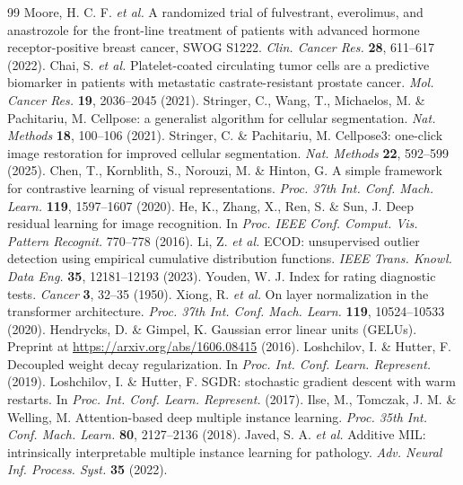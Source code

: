 \documentclass[11pt]{article}
\begin{document}
\begin{thebibliography}{99}
 Moore, H. C. F. \textit{et al.} A randomized trial of fulvestrant, everolimus, and anastrozole for the front-line treatment of patients with advanced hormone receptor-positive breast cancer, SWOG S1222. \textit{Clin. Cancer Res.} \textbf{28}, 611--617 (2022).
 Chai, S. \textit{et al.} Platelet-coated circulating tumor cells are a predictive biomarker in patients with metastatic castrate-resistant prostate cancer. \textit{Mol. Cancer Res.} \textbf{19}, 2036--2045 (2021).
 Stringer, C., Wang, T., Michaelos, M. \& Pachitariu, M. Cellpose: a generalist algorithm for cellular segmentation. \textit{Nat. Methods} \textbf{18}, 100--106 (2021).
 Stringer, C. \& Pachitariu, M. Cellpose3: one-click image restoration for improved cellular segmentation. \textit{Nat. Methods} \textbf{22}, 592--599 (2025).
 Chen, T., Kornblith, S., Norouzi, M. \& Hinton, G. A simple framework for contrastive learning of visual representations. \textit{Proc. 37th Int. Conf. Mach. Learn.} \textbf{119}, 1597--1607 (2020).
 He, K., Zhang, X., Ren, S. \& Sun, J. Deep residual learning for image recognition. In \textit{Proc. IEEE Conf. Comput. Vis. Pattern Recognit.} 770--778 (2016).
 Li, Z. \textit{et al.} ECOD: unsupervised outlier detection using empirical cumulative distribution functions. \textit{IEEE Trans. Knowl. Data Eng.} \textbf{35}, 12181--12193 (2023).
 Youden, W. J. Index for rating diagnostic tests. \textit{Cancer} \textbf{3}, 32--35 (1950).
 Xiong, R. \textit{et al.} On layer normalization in the transformer architecture. \textit{Proc. 37th Int. Conf. Mach. Learn.} \textbf{119}, 10524--10533 (2020).
 Hendrycks, D. \& Gimpel, K. Gaussian error linear units (GELUs). Preprint at \url{https://arxiv.org/abs/1606.08415} (2016).
 Loshchilov, I. \& Hutter, F. Decoupled weight decay regularization. In \textit{Proc. Int. Conf. Learn. Represent.} (2019).
 Loshchilov, I. \& Hutter, F. SGDR: stochastic gradient descent with warm restarts. In \textit{Proc. Int. Conf. Learn. Represent.} (2017).
 Ilse, M., Tomczak, J. M. \& Welling, M. Attention-based deep multiple instance learning. \textit{Proc. 35th Int. Conf. Mach. Learn.} \textbf{80}, 2127--2136 (2018).
 Javed, S. A. \textit{et al.} Additive MIL: intrinsically interpretable multiple instance learning for pathology. \textit{Adv. Neural Inf. Process. Syst.} \textbf{35} (2022).

\end{thebibliography}
\end{document}
